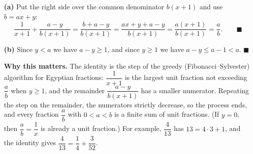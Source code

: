 \textbf{(a)} Put the right side over the common denominator $b(x+1)$ and use $b=ax+y$:
\[
\dfrac{1}{x+1}+\dfrac{a-y}{b(x+1)}=\dfrac{b+a-y}{b(x+1)}=\dfrac{ax+y+a-y}{b(x+1)}=\dfrac{a(x+1)}{b(x+1)}=\dfrac {a}{b} .\qquad\blacksquare
\]

\textbf{(b)} Since $y<a$ we have $a-y\ge1$, and since $y\ge1$ we have $a-y\le a-1<a$. $\blacksquare$

\textbf{Why this matters.} The identity is the step of the greedy (Fibonacci--Sylvester) algorithm for Egyptian fractions: $\dfrac{1}{x+1}$ is the largest unit fraction not exceeding $\dfrac {a}{b}$ when $y\ge1$, and the remainder $\dfrac{a-y}{b(x+1)}$ has a smaller numerator. Repeating the step on the remainder, the numerators strictly decrease, so the process ends, and every fraction $\dfrac {a}{b}$ with $0<a<b$ is a finite sum of unit fractions. (If $y=0$, then $\dfrac {a}{b}=\dfrac{1}{x}$ is already a unit fraction.) For example, $\dfrac{4}{13}$ has $13=4\cdot3+1$, and the identity gives $\dfrac{4}{13}=\dfrac{1}{4}+\dfrac{3}{52}$.
